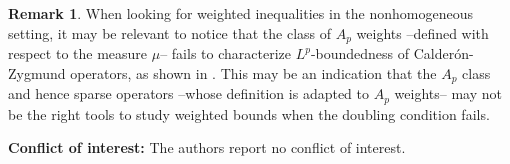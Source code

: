 \documentclass[12pt]{amsart}
\theoremstyle{plain}
\theoremstyle{definition} %
\newtheorem{remark}[theorem]{Remark} %
\numberwithin{equation}{section}
\begin{document}
\begin{remark}
When looking for weighted inequalities in the nonhomogeneous setting, it may be relevant to notice that the class of $A_p$ weights --defined with respect to the measure $\mu$-- fails to characterize $L^p$-boundedness of Calder\'on-Zygmund operators, as shown in \cite{To2007}. This may be an indication that the $A_p$ class and hence sparse operators --whose definition is adapted to $A_p$ weights-- may not be the right tools to study weighted bounds when the doubling condition fails.   
\end{remark} 

\noindent\textbf{Conflict of interest:} The authors report no conflict of interest. 



\end{document}
